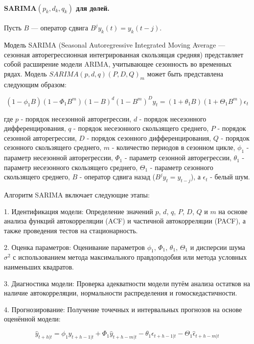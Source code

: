 \documentclass[14pt,a4paper]{article}
\begin{document}
\paragraph{SARIMA$(p_k,d_k,q_k)$ для долей.}
Пусть $B$ — оператор сдвига $B^j y_k(t)=y_k(t-j)$.  

Модель SARIMA (Seasonal Autoregressive Integrated Moving Average — сезонная авторегрессионная интегрированная скользящая средняя) представляет собой расширение модели ARIMA, учитывающее сезонность во временных рядах. Модель $SARIMA(p,d,q)(P,D,Q)_m$ может быть представлена следующим образом:

\begin{equation}
(1-\phi_1 B) (1-\Phi_1 B^m)(1-B)^d(1-B^m)^D y_t = (1+\theta_1 B) (1+\Theta_1 B^m)\epsilon_t
\end{equation}

где $p$ - порядок несезонной авторегрессии, $d$ - порядок несезонного дифференцирования, $q$ - порядок несезонного скользящего среднего, $P$ - порядок сезонной авторегрессии, $D$ - порядок сезонного дифференцирования, $Q$ - порядок сезонного скользящего среднего, $m$ - количество периодов в сезонном цикле, $\phi_1$ - параметр несезонной авторегрессии, $\Phi_1$ - параметр сезонной авторегрессии, $\theta_1$ - параметр несезонного скользящего среднего, $\Theta_1$ - параметр сезонного скользящего среднего, $B$ - оператор сдвига назад ($B^j y_t = y_{t-j}$), а $\epsilon_t$ - белый шум.

Алгоритм SARIMA включает следующие этапы:

1. Идентификация модели: Определение значений $p$, $d$, $q$, $P$, $D$, $Q$ и $m$ на основе анализа функций автокорреляции (ACF) и частичной автокорреляции (PACF), а также проведения тестов на стационарность.

2. Оценка параметров: Оценивание параметров $\phi_1$, $\Phi_1$, $\theta_1$, $\Theta_1$ и дисперсии шума $\sigma^2$ с использованием метода максимального правдоподобия или метода условных наименьших квадратов.

3. Диагностика модели: Проверка адекватности модели путём анализа остатков на наличие автокорреляции, нормальности распределения и гомоскедастичности.

4. Прогнозирование: Получение точечных и интервальных прогнозов на основе оценённой модели:

\begin{equation}
\hat{y}_{t+h|t} = \phi_1 \hat{y}_{t+h-1|t} + \Phi_1 \hat{y}_{t+h-m|t} - \theta_1 \hat{\epsilon}_{t+h-1|t} - \Theta_1 \hat{\epsilon}_{t+h-m|t}
\end{equation}
\end{document}
